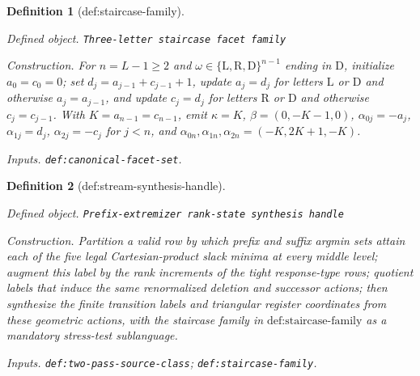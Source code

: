 \documentclass{article}
\newtheorem{definition}{Definition}
\begin{document}
\begin{definition}[def:staircase-family]\label{def:staircase-family}
\par\smallskip\noindent\emph{Defined object.} \texttt{Three-\allowbreak{}letter staircase facet family}
\par\smallskip\noindent\emph{Construction.} For \(n=L-1\ge2\) and \(\omega\in\{\mathrm L,\mathrm R,\mathrm D\}^{n-1}\) ending in \(\mathrm D\), initialize \(a_0=c_0=0\); set \(d_j=a_{j-1}+c_{j-1}+1\), update \(a_j=d_j\) for letters \(\mathrm L\) or \(\mathrm D\) and otherwise \(a_j=a_{j-1}\), and update \(c_j=d_j\) for letters \(\mathrm R\) or \(\mathrm D\) and otherwise \(c_j=c_{j-1}\). With \(K=a_{n-1}=c_{n-1}\), emit \(\kappa=K\), \(\beta=(0,-K-1,0)\), \(\alpha_{0j}=-a_j\), \(\alpha_{1j}=d_j\), \(\alpha_{2j}=-c_j\) for \(j<n\), and \(\alpha_{0n},\alpha_{1n},\alpha_{2n}=(-K,2K+1,-K)\).
\par\smallskip\noindent\emph{Inputs.} \texttt{def:\allowbreak{}canonical-\allowbreak{}facet-\allowbreak{}set}.
\end{definition}

\begin{definition}[def:stream-synthesis-handle]\label{def:stream-synthesis-handle}
\par\smallskip\noindent\emph{Defined object.} \texttt{Prefix-\allowbreak{}extremizer rank-\allowbreak{}state synthesis handle}
\par\smallskip\noindent\emph{Construction.} Partition a valid row by which prefix and suffix argmin sets attain each of the five legal Cartesian-product slack minima at every middle level; augment this label by the rank increments of the tight response-type rows; quotient labels that induce the same renormalized deletion and successor actions; then synthesize the finite transition labels and triangular register coordinates from these geometric actions, with the staircase family in \(\text{def:staircase-family}\) as a mandatory stress-test sublanguage.
\par\smallskip\noindent\emph{Inputs.} \texttt{def:\allowbreak{}two-\allowbreak{}pass-\allowbreak{}source-\allowbreak{}class}; \texttt{def:\allowbreak{}staircase-\allowbreak{}family}.
\end{definition}
\end{document}
